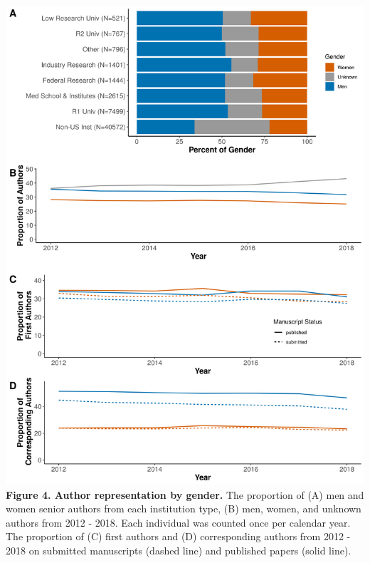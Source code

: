 \documentclass[11pt,]{article}
\begin{document}
\newpage

\includegraphics{Figure_4.png} \textbf{Figure 4. Author representation
by gender.} The proportion of (A) men and women senior authors from each
institution type, (B) men, women, and unknown authors from 2012 - 2018.
Each individual was counted once per calendar year. The proportion of
(C) first authors and (D) corresponding authors from 2012 - 2018 on
submitted manuscripts (dashed line) and published papers (solid line).

\newpage
\end{document}
